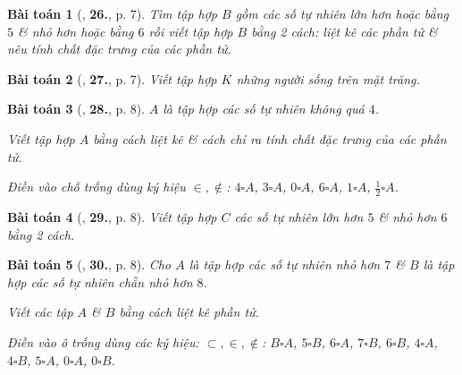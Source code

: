 \documentclass{article}
\numberwithin{equation}{section}
\newtheorem{baitoan}{Bài toán}[section]
\begin{document}
\begin{baitoan}[\cite{Trong_Toan_6_2021}, \textbf{26.}, p. 7]
	Tìm tập hợp $B$ gồm các số tự nhiên lớn hơn hoặc bằng $5$ \& nhỏ hơn hoặc bằng $6$ rồi viết tập hợp $B$ bằng 2 cách: liệt kê các phần tử \& nêu tính chất đặc trưng của các phần tử.
\end{baitoan}

\begin{baitoan}[\cite{Trong_Toan_6_2021}, \textbf{27.}, p. 7]
	Viết tập hợp $K$ những người sống trên mặt trăng.
\end{baitoan}

\begin{baitoan}[\cite{Trong_Toan_6_2021}, \textbf{28.}, p. 8]
	$A$ là tập hợp các số tự nhiên không quá $4$.
	\begin{enumerate*}
		\item Viết tập hợp $A$ bằng cách liệt kê \& cách chỉ ra tính chất đặc trưng của các phần tử.
		\item Điền vào chỗ trống dùng ký hiệu $\in,\notin$: $4\square A$, $3\square A$, $0\square A$, $6\square A$, $1\square A$, $\frac{1}{2}\square A$.
	\end{enumerate*}
\end{baitoan}

\begin{baitoan}[\cite{Trong_Toan_6_2021}, \textbf{29.}, p. 8]
	Viết tập hợp $C$ các số tự nhiên lớn hơn $5$ \& nhỏ hơn $6$ bằng 2 cách.
\end{baitoan}

\begin{baitoan}[\cite{Trong_Toan_6_2021}, \textbf{30.}, p. 8]
	Cho $A$ là tập hợp các số tự nhiên nhỏ hơn $7$ \& $B$ là tập hợp các số tự nhiên chẵn nhỏ hơn $8$.
	\begin{enumerate*}
		\item Viết các tập $A$ \& $B$ bằng cách liệt kê phần tử.
		\item Điền vào ô trống dùng các ký hiệu: $\subset,\in,\notin$: $B\square A$, $5\square B$, $6\square A$, $7\square B$, $6\square B$, $4\square A$, $4\square B$, $5\square A$, $0\square A$, $0\square B$.
	\end{enumerate*}
\end{baitoan}
\end{document}
